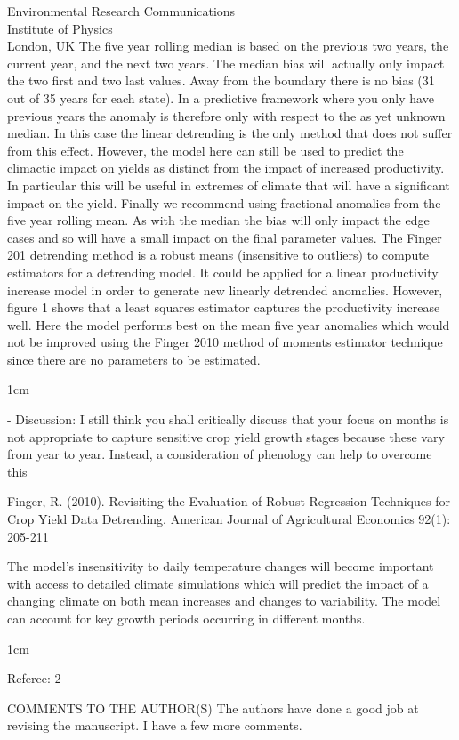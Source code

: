 \documentclass{letter}
\newcommand{\review}[1]{   
    \begin{adjustwidth}{1cm}{}
    \em{#1}
    \end{adjustwidth}
    }
\begin{document}
\begin{letter}{Environmental Research Communications \\ Institute of Physics \\ London, UK}
The five year rolling median is based on the previous two years, the current year, and the next two years. The median bias will actually only impact the two first and two last values. Away from the boundary there is no bias (31 out of 35 years for each state). In a predictive framework where you only have previous years the anomaly is therefore only with respect to the as yet unknown median. In this case the linear detrending is the only method that does not suffer from this effect. However, the model here can still be used to predict the climactic impact on yields as distinct from the impact of increased productivity. In particular this will be useful in extremes of climate that will have a significant impact on the yield. Finally we recommend using fractional anomalies from the five year rolling mean. As with the median the bias will only impact the edge cases and so will have a small impact on the final parameter values. The Finger 201 detrending method is a robust means (insensitive to outliers) to compute estimators for a detrending model. It could be applied for a linear productivity increase model in order to generate new linearly detrended anomalies. However, figure 1 shows that a least squares estimator captures the productivity increase well. Here the model performs best on the mean five year anomalies which would not be improved using the Finger 2010 method of moments estimator technique since there are no parameters to be estimated.


\review{

- Discussion: I still think you shall critically discuss that your focus on months is not appropriate to capture sensitive crop yield growth stages because these vary from year to year. Instead, a consideration of phenology can help to overcome this

Finger, R. (2010). Revisiting the Evaluation of Robust Regression Techniques for Crop Yield Data Detrending. American Journal of Agricultural Economics 92(1): 205-211
}

The model's insensitivity to daily temperature changes will become important with access to detailed climate simulations which will predict the impact of a changing climate on both mean increases and changes to variability. The model can account for key growth periods occurring in different months.


\review{
Referee: 2

COMMENTS TO THE AUTHOR(S)
The authors have done a good job at revising the manuscript. I have a few more comments.

}
\end{letter}
\end{document}
